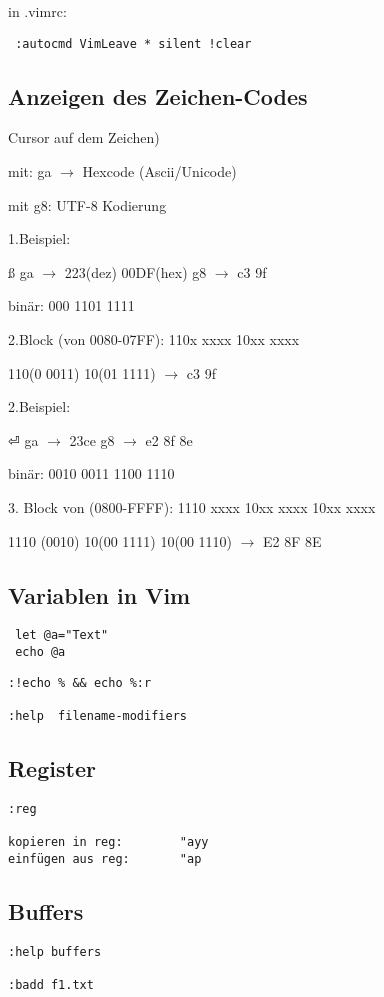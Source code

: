 in .vimrc:

\begin{verbatim}
 :autocmd VimLeave * silent !clear 
\end{verbatim}




\subsection{Anzeigen des Zeichen-Codes}

Cursor auf dem Zeichen)

mit:  ga  $\rightarrow$ Hexcode (Ascii/Unicode)

mit g8:  UTF-8 Kodierung


1.Beispiel:

ß   ga $\rightarrow$ 223(dez) 00DF(hex) g8 $\rightarrow$ c3 9f 

binär: 000 1101 1111

2.Block (von 0080-07FF): 110x xxxx 10xx xxxx

110(0 0011) 10(01 1111) $\rightarrow$ c3 9f

2.Beispiel:

⏎  ga $\rightarrow$ 23ce g8 $\rightarrow$ e2 8f 8e

binär: 0010 0011 1100 1110

3. Block von (0800-FFFF): 1110 xxxx 10xx xxxx 10xx xxxx

1110 (0010) 10(00 1111) 10(00 1110) $\rightarrow$ E2 8F 8E

\subsection{Variablen in Vim}

\begin{verbatim}
 let @a="Text"
 echo @a
\end{verbatim}

\begin{verbatim}
:!echo % && echo %:r  

:help  filename-modifiers
\end{verbatim}

\subsection{Register}

\begin{verbatim}
:reg

kopieren in reg:		"ayy
einfügen aus reg:		"ap

\end{verbatim}

\subsection{Buffers}
\begin{verbatim}
:help buffers

:badd f1.txt
\end{verbatim}

